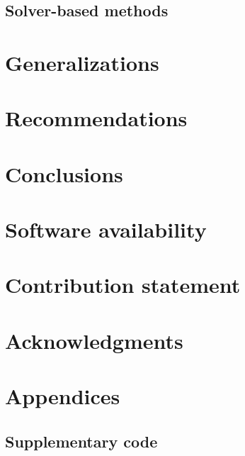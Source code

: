 \documentclass[11pt]{article}
\begin{document}
\subsection{Solver-based methods}
\label{section:solver-methods}


\section{Generalizations}
\label{section:generalization}


\section{Recommendations}
\label{section:recomendations}


\section{Conclusions}


% 

\vspace{30px}
\section*{Software availability}

\section*{Contribution statement}

\section*{Acknowledgments}


\newpage
\appendix
\section*{Appendices}
\renewcommand{\thesubsection}{\Alph{subsection}}

% 
% 
\subsection{Supplementary code}

\label{appedix:code}



\newpage
\printbibliography[heading=bibintoc, title={References}]
\end{document}

